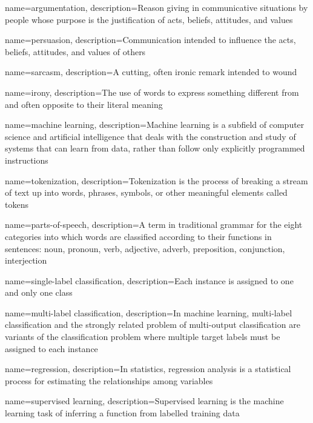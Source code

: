 {
	name=argumentation,
	description={Reason giving in communicative situations by people whose purpose is the justification of acts, beliefs, attitudes, and values} 
}

{
	name=persuasion,
	description={Communication intended to influence the acts, beliefs, attitudes, and values of others} 
}

{
	name=sarcasm,
	description={A cutting, often ironic remark intended to wound} 
}

{
	name=irony,
	description={The use of words to express something different from and often opposite to their literal meaning} 
}

{
	name=machine learning,
	description={Machine learning is a subfield of computer science and artificial intelligence that deals with the construction and study of systems that can learn from data, rather than follow only explicitly programmed instructions} 
}

{
	name=tokenization,
	description={Tokenization is the process of breaking a stream of text up into words, phrases, symbols, or other meaningful elements called tokens} 
}

{
	name=parts-of-speech,
	description={A term in traditional grammar for the eight categories into which words are classified according to their functions in sentences: noun, pronoun, verb, adjective, adverb, preposition, conjunction, interjection}
	}
	
{
	name=single-label classification,
	description={Each instance is assigned to one and only one class}
}

{
	name=multi-label classification,
	description={In machine learning, multi-label classification and the strongly related problem of multi-output classification are variants of the classification problem where multiple target labels must be assigned to each instance}
}

{
	name=regression,
	description={In statistics, regression analysis is a statistical process for estimating the relationships among variables}
}

{
	name=supervised learning,
	description={Supervised learning is the machine learning task of inferring a function from labelled training data} 
}

